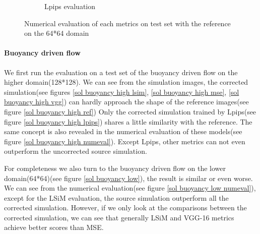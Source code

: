 \documentclass[a4paper,12pt,twoside]{report}
\begin{document}
\begin{figure}
\begin{subfigure}{0.32\textwidth}
		\caption{Lpips evaluation}
	\end{subfigure}
	\caption{Numerical evaluation of each metrics on test set with the reference on the 64*64 domain}
	\label{sol karman low numeval}
\end{figure}

\paragraph{Buoyancy driven flow}
We first run the evaluation on a test set of the buoyancy driven flow on the higher domain(128*128). We can see from the simulation images, the corrected simulation(see figures \ref{sol buoyancy high lsim}, \ref{sol buoyancy high mse}, \ref{sol buoyancy high vgg}) can hardly approach the shape of the reference images(see figure \ref{sol buoyancy high ref}) Only the corrected simulation trained by Lpips(see figure \ref{sol buoyancy high lpips}) shares a little similarity with the reference. The same concept is also revealed in the numerical evaluation of these models(see figure \ref{sol buoyancy high numeval}). Except Lpips, other metrics can not even outperform the uncorrected source simulation. 

For completeness we also turn to the buoyancy driven flow on the lower domain(64*64)(see figure \ref{sol buoyancy low}), the result is similar or even worse. We can see from the numerical evaluation(see figure \ref{sol buoyancy low numeval}), except for the LSiM evaluation, the source simulation outperform all the corrected simulation. However, if we only look at the comparisons between the corrected simulation, we can see that generally LSiM and VGG-16 metrics achieve better scores than MSE.
\end{document}
